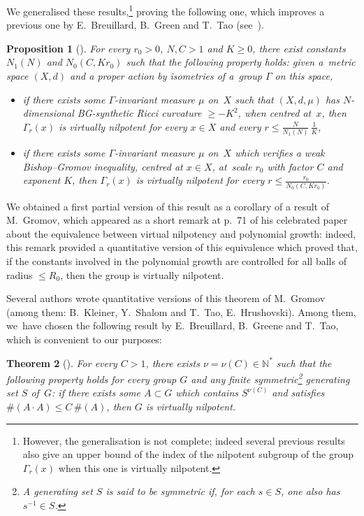 \documentclass[10pt,a4paper]{amsart}
\numberwithin{equation}{section}
\newtheorem{theor}{Theorem}[section]
\newtheorem{prop}[theor]{Proposition}
\newcommand{\N}{\mathbb{N}}
\begin{document}
We generalised these results,\footnote{However, the generalisation is not complete; indeed several previous results also give an upper bound of the
index of the nilpotent subgroup of the group $\Gamma_r (x)$ when this one
is virtually nilpotent.} proving the following one, which improves a previous one by E.~Breuillard, B.~Green and T.~Tao (see~\cite{BGT}).

\begin{prop}[{\cite[Corollary~5.20]{BCGS}}]\label{Marg1}
For every $r_0 >0$, $N, C > 1 $ and $K\ge 0$, there exist constants
$N_1 (N)$ and $N_0 (C, Kr_0)$ such that the following property holds: given
a~metric space $(X,d)$ and a proper action by isometries of a~group $\Gamma$ on this space,
\begin{itemize}\itemsep=0pt
\item[$(i)$] if there exists some $\Gamma$-invariant measure $\mu$ on~$X$ such that $(X,d,\mu)$ has $N$-dimensional BG-synthetic Ricci curvature $\ge -K^2$, when centred at~$x$, then $\Gamma_r (x)$ is virtually nilpotent for every $x \in X$ and every $r \le \frac{N}{N_1 (N)}\, \frac{1}{K}$,
\item[$(ii)$] if there exists some $\Gamma$-invariant measure $\mu$ on~$X$ which verifies a weak Bishop--Gromov inequality, centred at $x\in X$, at~scale
$r_0$ with factor $C$ and exponent $K$, then $\Gamma_{r} (x)$ is virtually nilpotent for every $r \le \frac{r_0}{ N_0 (C, Kr_0)}$.
\end{itemize}
\end{prop}

We obtained a first partial version of this result as a corollary of a result of M.~Gromov, which appeared as a short remark at p.~71 of his celebrated paper~\cite{Gr3}
about the equivalence between virtual nilpotency and polynomial growth: indeed, this remark provided a quantitative version of this equivalence which
proved that, if the constants involved in the polynomial growth are controlled for all balls of radius $\le R_0$, then the group is virtually nilpotent.

Several authors wrote quantitative versions of this theorem of M.~Gromov (among them: B.~Kleiner, Y.~Shalom and T.~Tao, E.~Hrushovski). Among them, we~have chosen the following result by E.~Breuillard, B.~Greene and T.~Tao, which is convenient to our purposes:

\begin{theor}[{\cite[Corollary~11.2]{BGT}}]\label{BGT}
For every $ C > 1$, there exists $ \nu = \nu (C) \in \N^*$ such that the following
property holds for every group $ G$ and any finite symmetric\footnote{A generating set $S$ is said to be symmetric if, for each $s \in S$,
one also has $s^{-1} \in S$.} generating set $S$ of~$G$: if there exists
some $A \subset G$ which contains $S^{\nu (C)}$ and satisfies $\# (A\cdot
A) \le C \,\# (A)$, then
$G$ is virtually nilpotent.
\end{theor}
\end{document}
